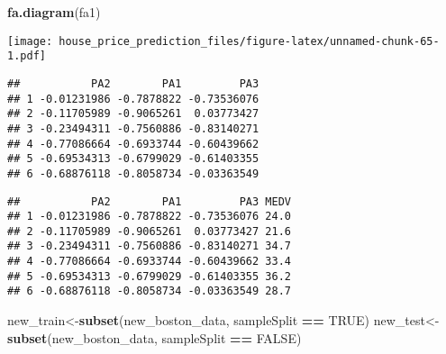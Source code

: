 \documentclass[
]{article}
\newenvironment{Shaded}{\begin{snugshade}}{\end{snugshade}}
\newcommand{\KeywordTok}[1]{\textcolor[rgb]{0.13,0.29,0.53}{\textbf{#1}}}
\newcommand{\NormalTok}[1]{#1}
\newcommand{\OperatorTok}[1]{\textcolor[rgb]{0.81,0.36,0.00}{\textbf{#1}}}
\newcommand{\OtherTok}[1]{\textcolor[rgb]{0.56,0.35,0.01}{#1}}
\newcommand{\StringTok}[1]{\textcolor[rgb]{0.31,0.60,0.02}{#1}}
\begin{document}
\begin{Shaded}
\begin{Highlighting}[]
\KeywordTok{fa.diagram}\NormalTok{(fa1)}
\end{Highlighting}
\end{Shaded}

\texttt{[image: house\_price\_prediction\_files/figure-latex/unnamed-chunk-65-1.pdf]}

\begin{Shaded}
\end{Shaded}

\begin{verbatim}
##           PA2        PA1         PA3
## 1 -0.01231986 -0.7878822 -0.73536076
## 2 -0.11705989 -0.9065261  0.03773427
## 3 -0.23494311 -0.7560886 -0.83140271
## 4 -0.77086664 -0.6933744 -0.60439662
## 5 -0.69534313 -0.6799029 -0.61403355
## 6 -0.68876118 -0.8058734 -0.03363549
\end{verbatim}

\begin{Shaded}
\end{Shaded}

\begin{verbatim}
##           PA2        PA1         PA3 MEDV
## 1 -0.01231986 -0.7878822 -0.73536076 24.0
## 2 -0.11705989 -0.9065261  0.03773427 21.6
## 3 -0.23494311 -0.7560886 -0.83140271 34.7
## 4 -0.77086664 -0.6933744 -0.60439662 33.4
## 5 -0.69534313 -0.6799029 -0.61403355 36.2
## 6 -0.68876118 -0.8058734 -0.03363549 28.7
\end{verbatim}

\begin{Shaded}
\begin{Highlighting}[]
\NormalTok{new_train<-}\KeywordTok{subset}\NormalTok{(new_boston_data, sampleSplit }\OperatorTok{==}\StringTok{ }\OtherTok{TRUE}\NormalTok{)}
\NormalTok{new_test<-}\KeywordTok{subset}\NormalTok{(new_boston_data, sampleSplit }\OperatorTok{==}\StringTok{ }\OtherTok{FALSE}\NormalTok{)}
\end{Highlighting}
\end{Shaded}
\end{document}
